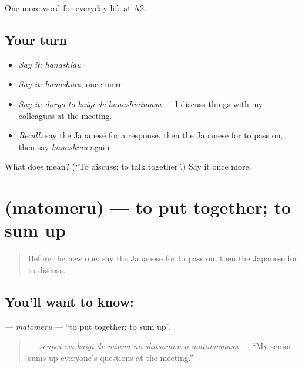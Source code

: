 \begin{grammarlens}[title={What you've built}]
One more word for everyday life at A2.
\end{grammarlens}

\subsection*{Your turn}
\begin{itemize}
\raggedright
  \item \emph{Say it:} \emph{hanashiau}
  \item \emph{Say it:} \emph{hanashiau}, once more
  \item \emph{Say it:} \emph{dōryō to kaigi de hanashiaimasu} — I discuss things with my colleagues at the meeting.
  \item \emph{Recall:} say the Japanese for a response, then the Japanese for to pass on, then say \emph{hanashiau} again
\end{itemize}

\begin{tcolorbox}[breakable,colback=teal!4,colframe=teal!35!black,title={Before you move on}]
What does  mean? (\textquotedblleft{}To discuss; to talk together\textquotedblright{}.) Say it once more.
\end{tcolorbox}
\section[\texorpdfstring{\ja{まとめる} (matomeru)}{まとめる (matomeru)}]{ (matomeru) — to put together; to sum up}

\label{lesson:JA-C232-matomeru}



\begin{quote}
Before the new one: say the Japanese for to pass on, then the Japanese for to discuss.
\end{quote}

\subsection*{You'll want to know: }
\textbf{} — \emph{matomeru} — \textquotedblleft{}to put together; to sum up\textquotedblright{}.

\begin{quote}
\textbf{    } — \emph{senpai wa kaigi de minna no shitsumon o matomemasu} — \textquotedblleft{}My senior sums up everyone's questions at the meeting.\textquotedblright{}
\end{quote}

